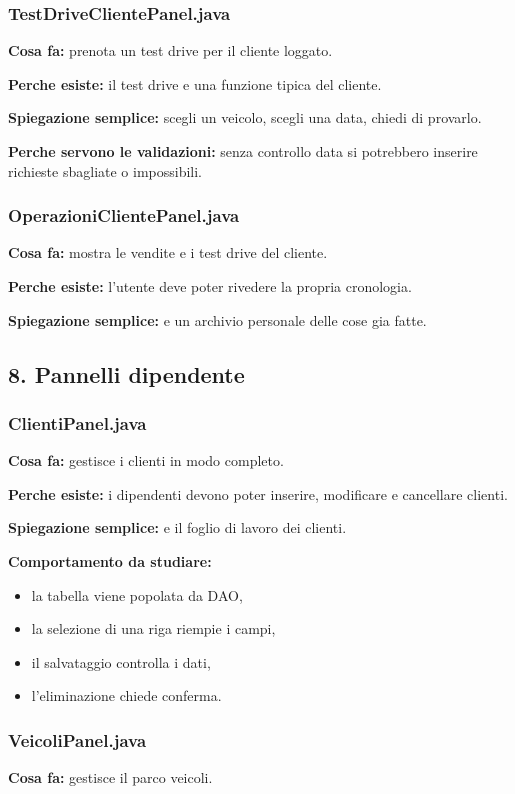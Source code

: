 \documentclass[12pt,a4paper]{article}
\begin{document}
\subsubsection*{TestDriveClientePanel.java}
\textbf{Cosa fa:} prenota un test drive per il cliente loggato.

\textbf{Perche esiste:} il test drive e una funzione tipica del cliente.

\textbf{Spiegazione semplice:} scegli un veicolo, scegli una data, chiedi di provarlo.

\textbf{Perche servono le validazioni:}
senza controllo data si potrebbero inserire richieste sbagliate o impossibili.

\subsubsection*{OperazioniClientePanel.java}
\textbf{Cosa fa:} mostra le vendite e i test drive del cliente.

\textbf{Perche esiste:} l'utente deve poter rivedere la propria cronologia.

\textbf{Spiegazione semplice:} e un archivio personale delle cose gia fatte.

\subsection{8. Pannelli dipendente}

\subsubsection*{ClientiPanel.java}
\textbf{Cosa fa:} gestisce i clienti in modo completo.

\textbf{Perche esiste:} i dipendenti devono poter inserire, modificare e cancellare clienti.

\textbf{Spiegazione semplice:} e il foglio di lavoro dei clienti.

\textbf{Comportamento da studiare:}
\begin{itemize}
  \item la tabella viene popolata da DAO,
  \item la selezione di una riga riempie i campi,
  \item il salvataggio controlla i dati,
  \item l'eliminazione chiede conferma.
\end{itemize}

\subsubsection*{VeicoliPanel.java}
\textbf{Cosa fa:} gestisce il parco veicoli.
\end{document}
